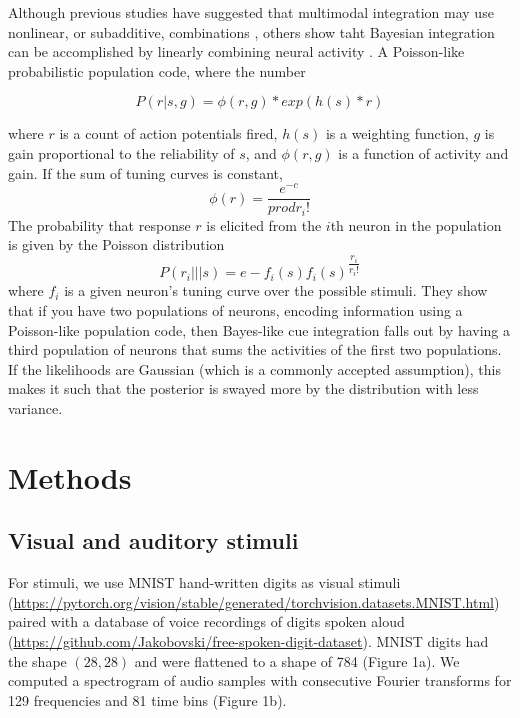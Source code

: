 \documentclass[conference]{IEEEtran}
\begin{document}
Although previous studies have suggested that multimodal integration may use nonlinear, or subadditive, combinations \cite{b2}, others show taht Bayesian integration can be accomplished by linearly combining neural activity \cite{b3}. A Poisson-like probabilistic population code, where the number

\begin{equation}
    P(r|s,g) = \phi(r,g) * exp(h(s)*r)
\end{equation}

where $r$ is a count of action potentials fired, $h(s)$ is a weighting function, $g$ is gain proportional to the reliability of $s$, and $\phi(r,g)$ is a function of activity and gain. If the sum of tuning curves is constant,
\begin{equation}
    \phi(r)=\dfrac{e^{-c}}{prod{r_i!}}
\end{equation}
The probability that response $r$ is elicited from the $i$th neuron in the population is given by the Poisson distribution
\begin{equation}
    P(r_i|||s)=e-f_i(s)f_i(s)^{\dfrac{r_i}{r_i!}} %
\end{equation}
where $f_i$ is a given neuron's tuning curve over the possible stimuli. They show that if you have two populations of neurons, encoding information using a Poisson-like population code, then Bayes-like cue integration falls out by having a third population of neurons that sums the activities of the first two populations. If the likelihoods are Gaussian (which is a commonly   accepted  assumption), this makes it such that the posterior is swayed more by the distribution with less variance.

\section{Methods}

\subsection{Visual and auditory stimuli}
For stimuli, we use MNIST hand-written digits as visual stimuli (\url{https://pytorch.org/vision/stable/generated/torchvision.datasets.MNIST.html}) paired with a database of voice recordings of digits spoken aloud (\url{https://github.com/Jakobovski/free-spoken-digit-dataset}). MNIST digits had the shape $(28,28)$ and were flattened to a shape of 784 (Figure 1a). We computed a spectrogram of audio samples with consecutive Fourier transforms for 129 frequencies and 81 time bins (Figure 1b).
\end{document}
